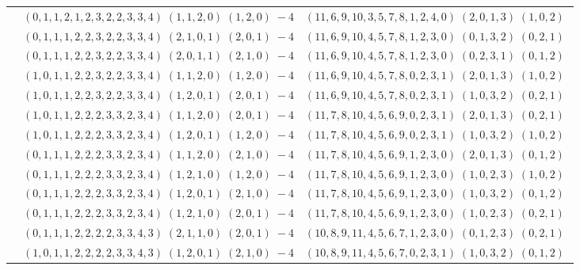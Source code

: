 \documentclass[11pt]{article}
\begin{document}
\begin{longtable}[l]{|c|c|c|}
 \cline{2-3} 
 & $(0 ,1 ,1 ,2 ,1 ,2 ,3 ,2 ,2 ,3 ,3 ,4) \;(1 ,1 ,2 ,0) \;(1 ,2 ,0) \;-4$ & $(11 ,6 ,9 ,10 ,3 ,5 ,7 ,8 ,1 ,2 ,4 ,0) \;(2 ,0 ,1 ,3) \;(1 ,0 ,2) \;$\\ 
 \cline{2-3} 
 & $(0 ,1 ,1 ,1 ,2 ,2 ,3 ,2 ,2 ,3 ,3 ,4) \;(2 ,1 ,0 ,1) \;(2 ,0 ,1) \;-4$ & $(11 ,6 ,9 ,10 ,4 ,5 ,7 ,8 ,1 ,2 ,3 ,0) \;(0 ,1 ,3 ,2) \;(0 ,2 ,1) \;$\\ 
 \cline{2-3} 
 & $(0 ,1 ,1 ,1 ,2 ,2 ,3 ,2 ,2 ,3 ,3 ,4) \;(2 ,0 ,1 ,1) \;(2 ,1 ,0) \;-4$ & $(11 ,6 ,9 ,10 ,4 ,5 ,7 ,8 ,1 ,2 ,3 ,0) \;(0 ,2 ,3 ,1) \;(0 ,1 ,2) \;$\\ 
 \cline{2-3} 
 & $(1 ,0 ,1 ,1 ,2 ,2 ,3 ,2 ,2 ,3 ,3 ,4) \;(1 ,1 ,2 ,0) \;(1 ,2 ,0) \;-4$ & $(11 ,6 ,9 ,10 ,4 ,5 ,7 ,8 ,0 ,2 ,3 ,1) \;(2 ,0 ,1 ,3) \;(1 ,0 ,2) \;$\\ 
 \cline{2-3} 
 & $(1 ,0 ,1 ,1 ,2 ,2 ,3 ,2 ,2 ,3 ,3 ,4) \;(1 ,2 ,0 ,1) \;(2 ,0 ,1) \;-4$ & $(11 ,6 ,9 ,10 ,4 ,5 ,7 ,8 ,0 ,2 ,3 ,1) \;(1 ,0 ,3 ,2) \;(0 ,2 ,1) \;$\\ 
 \cline{2-3} 
 & $(1 ,0 ,1 ,1 ,2 ,2 ,2 ,3 ,3 ,2 ,3 ,4) \;(1 ,1 ,2 ,0) \;(2 ,0 ,1) \;-4$ & $(11 ,7 ,8 ,10 ,4 ,5 ,6 ,9 ,0 ,2 ,3 ,1) \;(2 ,0 ,1 ,3) \;(0 ,2 ,1) \;$\\ 
 \cline{2-3} 
 & $(1 ,0 ,1 ,1 ,2 ,2 ,2 ,3 ,3 ,2 ,3 ,4) \;(1 ,2 ,0 ,1) \;(1 ,2 ,0) \;-4$ & $(11 ,7 ,8 ,10 ,4 ,5 ,6 ,9 ,0 ,2 ,3 ,1) \;(1 ,0 ,3 ,2) \;(1 ,0 ,2) \;$\\ 
 \cline{2-3} 
 & $(0 ,1 ,1 ,1 ,2 ,2 ,2 ,3 ,3 ,2 ,3 ,4) \;(1 ,1 ,2 ,0) \;(2 ,1 ,0) \;-4$ & $(11 ,7 ,8 ,10 ,4 ,5 ,6 ,9 ,1 ,2 ,3 ,0) \;(2 ,0 ,1 ,3) \;(0 ,1 ,2) \;$\\ 
 \cline{2-3} 
 & $(0 ,1 ,1 ,1 ,2 ,2 ,2 ,3 ,3 ,2 ,3 ,4) \;(1 ,2 ,1 ,0) \;(1 ,2 ,0) \;-4$ & $(11 ,7 ,8 ,10 ,4 ,5 ,6 ,9 ,1 ,2 ,3 ,0) \;(1 ,0 ,2 ,3) \;(1 ,0 ,2) \;$\\ 
 \cline{2-3} 
 & $(0 ,1 ,1 ,1 ,2 ,2 ,2 ,3 ,3 ,2 ,3 ,4) \;(1 ,2 ,0 ,1) \;(2 ,1 ,0) \;-4$ & $(11 ,7 ,8 ,10 ,4 ,5 ,6 ,9 ,1 ,2 ,3 ,0) \;(1 ,0 ,3 ,2) \;(0 ,1 ,2) \;$\\ 
 \cline{2-3} 
 & $(0 ,1 ,1 ,1 ,2 ,2 ,2 ,3 ,3 ,2 ,3 ,4) \;(1 ,2 ,1 ,0) \;(2 ,0 ,1) \;-4$ & $(11 ,7 ,8 ,10 ,4 ,5 ,6 ,9 ,1 ,2 ,3 ,0) \;(1 ,0 ,2 ,3) \;(0 ,2 ,1) \;$\\ 
 \cline{2-3} 
 & $(0 ,1 ,1 ,1 ,2 ,2 ,2 ,2 ,3 ,3 ,4 ,3) \;(2 ,1 ,1 ,0) \;(2 ,0 ,1) \;-4$ & $(10 ,8 ,9 ,11 ,4 ,5 ,6 ,7 ,1 ,2 ,3 ,0) \;(0 ,1 ,2 ,3) \;(0 ,2 ,1) \;$\\ 
 \cline{2-3} 
 & $(1 ,0 ,1 ,1 ,2 ,2 ,2 ,2 ,3 ,3 ,4 ,3) \;(1 ,2 ,0 ,1) \;(2 ,1 ,0) \;-4$ & $(10 ,8 ,9 ,11 ,4 ,5 ,6 ,7 ,0 ,2 ,3 ,1) \;(1 ,0 ,3 ,2) \;(0 ,1 ,2) \;$\\ 

\end{longtable}
\end{document}
